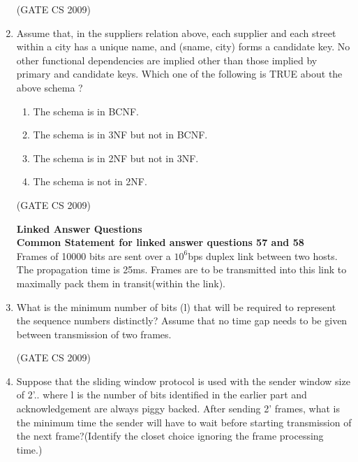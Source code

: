 \documentclass[a4paper, 11pt]{article}
\begin{document}
\begin{enumerate}
    \hfill (GATE CS 2009)
    
    \item Assume that, in the suppliers relation above, each supplier and each street within a city has a unique name, and (sname, city) forms a candidate key. No other functional dependencies are implied other than those implied by primary and candidate keys. Which one of the following is TRUE about the above schema ?
    \begin{enumerate}  
        \item The schema is in BCNF.
        \item The schema is in 3NF but not in BCNF.
        \item The schema is in 2NF but not in 3NF.
        \item The schema is not in 2NF.
    \end{enumerate}
    \hfill (GATE CS 2009)
    
    \textbf{{\LARGE Linked Answer Questions}} \\
    
    {\Large \textbf{Common Statement for linked answer questions 57 and 58}} \\    
    Frames of 10000 bits are sent over a $10^6$bps duplex link between two hosts. The propagation time is 25ms. Frames are to be transmitted into this link to maximally pack them in transit(within the link).
    \item What is the minimum number of bits (l) that will be required to represent the sequence numbers distinctly? Assume that no time gap needs to be given between transmission of two frames.

    \begin{enumerate}
    \end{enumerate}

    \hfill (GATE CS 2009)
    
    \item Suppose that the sliding window protocol is used with the sender window size of 2'.. where l is the number of bits identified in the earlier part and acknowledgement are always piggy backed. After sending 2' frames, what is the minimum time the sender will have to wait before starting transmission of the next frame?(Identify the closet choice ignoring the frame processing time.)
    \begin{enumerate}
    \end{enumerate}
    

\end{enumerate}
\end{document}
